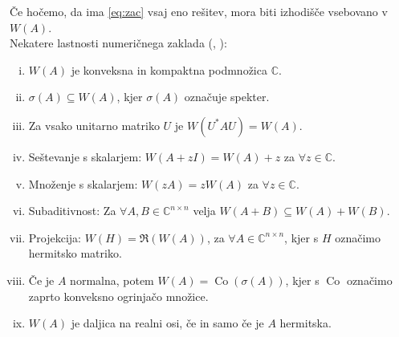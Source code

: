 \documentclass[12pt,a4paper]{amsart}
\theoremstyle{definition}
\theoremstyle{plain}
\newcommand{\Co}{\operatorname{Co}} %
\newcommand{\C}{\mathbb C}
\begin{document}
Če hočemo, da ima \eqref{eq:zac} vsaj eno rešitev, mora biti izhodišče vsebovano v $W(A)$. \\

Nekatere lastnosti numeričnega zaklada (\cite{num}, \cite{zaloga}):
\begin{enumerate}[i.]
\item $W(A)$ je konveksna in kompaktna podmnožica $\C$.
\item $\sigma(A)\subseteq W(A)$, kjer $\sigma(A)$ označuje spekter.
\item Za vsako unitarno matriko $U$ je $W(U^\ast AU)=W(A).$
\item Seštevanje s skalarjem: $W(A+zI)=W(A)+z$ za $\forall z \in \C$.
\item Množenje s skalarjem: $W(zA)=zW(A)$ za $\forall z \in \C$.
\item Subaditivnost: Za $\forall A, B \in \C^{n\times n}$ velja $W(A+B) \subseteq W(A) +W(B).$
\item Projekcija: $W(H)= \Re( W(A))$, za $\forall A\in \C^{n\times n}$, kjer s $H$ označimo hermitsko matriko.
\item Če je $A$ normalna, potem $W(A)=\Co(\sigma(A))$, kjer s $\Co$ označimo zaprto konveksno ogrinjačo množice.
\item $W(A)$ je daljica na realni osi, če in samo če je $A$ hermitska.
\end{enumerate}
\end{document}
